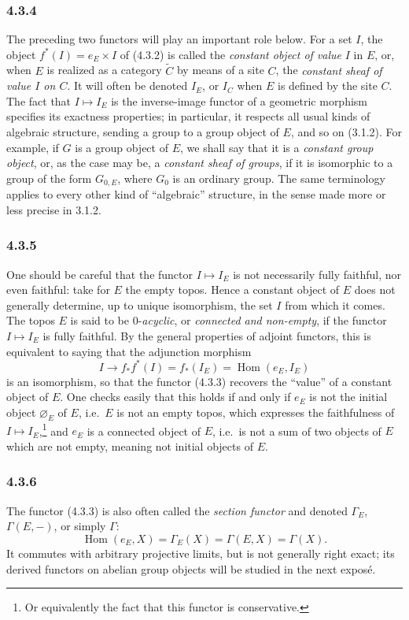 \documentclass[11pt]{article}
\newcommand{\Hom}{\operatorname{Hom}}
\newcommand{\ie}{i.e.}
\begin{document}
\subsubsection*{4.3.4}
The preceding two functors will play an important role below. For a set \(I\), the object \(f^\ast(I)=e_E\times I\) of (4.3.2) is called the \emph{constant object of value} \(I\) in \(E\), or, when \(E\) is realized as a category \(\widetilde C\) by means of a site \(C\), the \emph{constant sheaf of value \(I\) on \(C\)}. It will often be denoted \(I_E\), or \(I_C\) when \(E\) is defined by the site \(C\). The fact that \(I\mapsto I_E\) is the inverse-image functor of a geometric morphism specifies its exactness properties; in particular, it respects all usual kinds of algebraic structure, sending a group to a group object of \(E\), and so on (3.1.2). For example, if \(G\) is a group object of \(E\), we shall say that it is a \emph{constant group object}, or, as the case may be, a \emph{constant sheaf of groups}, if it is isomorphic to a group of the form \(G_{0,E}\), where \(G_0\) is an ordinary group. The same terminology applies to every other kind of ``algebraic'' structure, in the sense made more or less precise in 3.1.2.

\subsubsection*{4.3.5}
One should be careful that the functor \(I\mapsto I_E\) is not necessarily fully faithful, nor even faithful: take for \(E\) the empty topos. Hence a constant object of \(E\) does not generally determine, up to unique isomorphism, the set \(I\) from which it comes. The topos \(E\) is said to be \(0\)-\emph{acyclic}, or \emph{connected and non-empty}, if the functor \(I\mapsto I_E\) is fully faithful. By the general properties of adjoint functors, this is equivalent to saying that the adjunction morphism
\[
I\longrightarrow f_\ast f^\ast(I)=f_\ast(I_E)=\Hom(e_E,I_E)
\]
is an isomorphism, so that the functor (4.3.3) recovers the ``value'' of a constant object of \(E\). One checks easily that this holds if and only if \(e_E\) is not the initial object \(\varnothing_E\) of \(E\), \ie\ \(E\) is not an empty topos, which expresses the faithfulness of \(I\mapsto I_E\),\footnote{Or equivalently the fact that this functor is conservative.} and \(e_E\) is a connected object of \(E\), \ie\ is not a sum of two objects of \(E\) which are not empty, meaning not initial objects of \(E\).

\subsubsection*{4.3.6}
The functor (4.3.3) is also often called the \emph{section functor} and denoted \(\Gamma_E\), \(\Gamma(E,-)\), or simply \(\Gamma\):
\[
\Hom(e_E,X)=\Gamma_E(X)=\Gamma(E,X)=\Gamma(X).\tag{4.3.6.1}
\]
It commutes with arbitrary projective limits, but is not generally right exact; its derived functors on abelian group objects will be studied in the next expos\'e.
\end{document}
